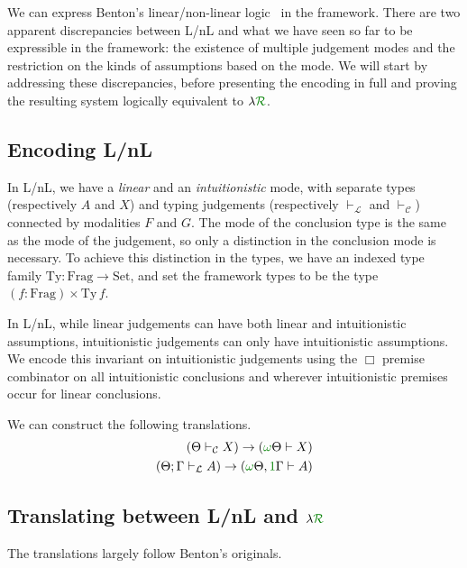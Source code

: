 We can express Benton's linear/non-linear logic~\cite{Benton94} in the
framework.
There are two apparent discrepancies between L/nL and what we have seen so far
to be expressible in the framework: the existence of multiple judgement modes
and the restriction on the kinds of assumptions based on the mode.
We will start by addressing these discrepancies, before presenting the encoding
in full and proving the resulting system logically equivalent to
$\lambda\gr{\mathcal R}$.

\subsection{Encoding L/nL}

In L/nL, we have a \emph{linear} and an \emph{intuitionistic} mode, with
separate types (respectively $A$ and $X$) and typing judgements (respectively
$\vdash_{\mathcal L}$ and $\vdash_{\mathcal C}$) connected by modalities $F$ and
$G$.
The mode of the conclusion type is the same as the mode of the judgement, so
only a distinction in the conclusion mode is necessary.
To achieve this distinction in the types, we have an indexed type family
$\mathrm{Ty} : \mathrm{Frag} \to \mathrm{Set}$, and set the framework types to
be the type $(f : \mathrm{Frag}) \times \mathrm{Ty}\,f$.

In L/nL, while linear judgements can have both linear and intuitionistic
assumptions, intuitionistic judgements can only have intuitionistic assumptions.
We encode this invariant on intuitionistic judgements using the $\Box$
premise combinator on all intuitionistic conclusions and wherever
intuitionistic premises occur for linear conclusions.

\begin{proposition}
  We can construct the following translations.
  \begin{align}
    (\Theta \vdash_{\mathcal C} X) \to (\gr\omega\Theta \vdash X) \\
    (\Theta; \Gamma \vdash_{\mathcal L} A) \to
    (\gr\omega\Theta, \gr1\Gamma \vdash A)
  \end{align}
\end{proposition}

\subsection{Translating between L/nL and $\lambda\gr{\mathcal R}$}

The translations largely follow Benton's originals.
